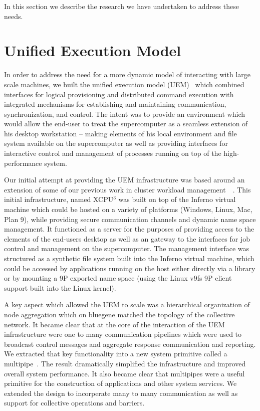 In this section we describe the research we have undertaken to address these needs. 

\section{Unified Execution Model}

In order to address the need for a more dynamic model of interacting with large scale machines,
we built the unified execution model (UEM)~\cite{uem} which combined interfaces for logical provisioning 
and distributed command execution with integrated mechanisms for establishing and maintaining 
communication, synchronization, and control.  The intent was to provide an environment which
would allow the end-user to treat the supercomputer as a seamless extension of his desktop
workstation -- making elements of his local environment and file system available on the 
supercomputer as well as providing interfaces for interactive control and management of 
processes running on top of the high-performance system.

Our initial attempt at providing the UEM infrastructure was based around an extension of 
some of our previous work in cluster workload management~\cite{xcpu}~\cite{xcpu2}.  This 
initial infrastructure, named XCPU$^3$ was built on top of the Inferno virtual machine which could be
hosted on a variety of platforms (Windows, Linux, Mac, Plan 9), while providing secure 
communication channels and dynamic name space management.  It functioned as a server
for the purposes of providing access to the elements of the end-users desktop as well
as an gateway to the interfaces for job control and management on the supercomputer.
The management interface was structured as a synthetic file system built into the 
Inferno virtual machine, which could be accessed by applications running on the host
either directly via a library or by mounting a 9P exported name space (using the Linux
v9fs 9P client support built into the Linux kernel).

A key aspect which allowed the UEM to scale was a hierarchical organization of node
aggregation which on bluegene matched the topology of the collective network.  It became
clear that at the core of the interaction of the UEM infrastructure were one to many
communication pipelines which were used to broadcast control messages and aggregate
response communication and reporting.  We extracted that key functionality into a new
system primitive called a multipipe~\cite{multipipe}.  The result dramatically simplified
the infrastructure and improved overall system performance.  It also became clear that
multipipes were a useful primitive for the construction of applications and other system
services.  We extended the design to incorperate many to many communication as well as
support for collective operations and barriers.

